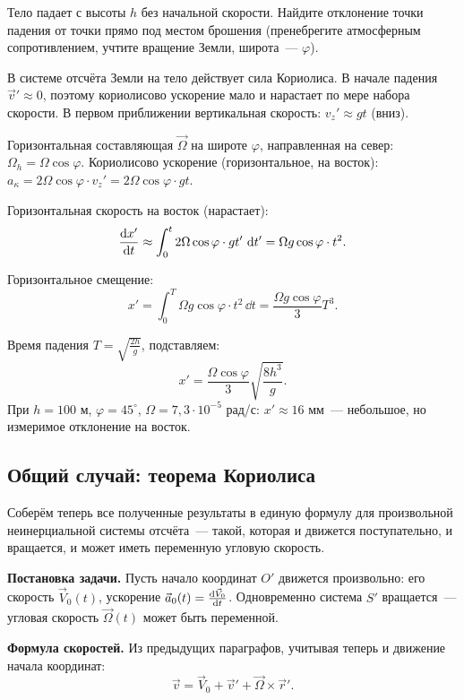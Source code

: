 \documentclass[../main.tex]{subfiles}
\begin{document}
\begin{example}
Тело падает с высоты $h$ без начальной скорости.
Найдите отклонение точки падения от точки прямо под местом
брошения (пренебрегите атмосферным сопротивлением,
учтите вращение Земли, широта~--- $\varphi$).

В системе отсчёта Земли на тело действует сила Кориолиса.
В начале падения $\vec{v}' \approx 0$, поэтому кориолисово ускорение
мало и нарастает по мере набора скорости. В первом приближении
вертикальная скорость: $v_z' \approx gt$ (вниз).

Горизонтальная составляющая $\vec{\Omega}$ на широте $\varphi$,
направленная на север: $\Omega_h = \Omega\cos\varphi$.
Кориолисово ускорение (горизонтальное, на восток):
$a_\kappa = 2\Omega\cos\varphi \cdot v_z' = 2\Omega\cos\varphi \cdot gt$.

Горизонтальная скорость на восток (нарастает):
\[
    \dv{x'}{t} \approx \int_0^t 2\Omega\cos\varphi\cdot g t'\,\dd{t'} = \Omega g\cos\varphi\cdot t^2.
\]

Горизонтальное смещение:
\[
    x' = \int_0^T \Omega g\cos\varphi\cdot t^2\,\dd{t} = \frac{\Omega g\cos\varphi}{3} T^3.
\]

Время падения $T = \sqrt{\frac{2h}{g}}$, подставляем:
\[
    x' = \frac{\Omega\cos\varphi}{3}\sqrt{\frac{8h^3}{g}}.
\]
При $h = 100$ м, $\varphi = 45^\circ$, $\Omega = 7{,}3\cdot10^{-5}$ рад/с:
$x' \approx 16$ мм~--- небольшое, но измеримое отклонение на восток.
\end{example}

\subsection{Общий случай: теорема Кориолиса}

Соберём теперь все полученные результаты в единую формулу для
произвольной неинерциальной системы отсчёта~--- такой,
которая и движется поступательно, и вращается, и может иметь
переменную угловую скорость.

\noindent\textbf{Постановка задачи.}
Пусть начало координат $O'$ движется произвольно:
его скорость $\vec{V}_0(t)$, ускорение $\vec{a}_0(t) = \dv{\vec{V}_0}{t}$.
Одновременно система $S'$ вращается~--- угловая скорость
$\vec{\Omega}(t)$ может быть переменной.

\noindent\textbf{Формула скоростей.}
Из предыдущих параграфов, учитывая теперь и движение начала координат:
\[
    \vec{v} = \vec{V}_0 + \vec{v}' + \vec{\Omega}\times\vec{r}'.
\]
\end{document}
